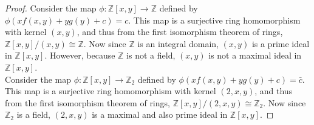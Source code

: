 \documentclass{article}
\begin{document}
  \begin{proof}
    Consider the map $\phi:\mathbb{Z}[x,y]\rightarrow\mathbb{Z}$
    defined by $\phi(xf(x,y)+yg(y)+c)=c$. This map is a surjective ring
    homomorphism with kernel $(x,y)$, and thus from the first isomorphism
    theorem of rings, $\mathbb{Z}[x,y]/(x,y)\cong\mathbb{Z}$. Now since
    $\mathbb{Z}$ is an integral domain, $(x,y)$ is a prime ideal in
    $\mathbb{Z}[x,y]$. However, because $\mathbb{Z}$ is not a field,
    $(x,y)$ is not a maximal ideal in $\mathbb{Z}[x,y]$. \\

    Consider the map $\phi:\mathbb{Z}[x,y]\rightarrow\mathbb{Z}_2$
    defined by $\phi(xf(x,y)+yg(y)+c)=\bar{c}$. This map is a surjective ring
    homomorphism with kernel $(2,x,y)$, and thus from the first isomorphism
    theorem of rings, $\mathbb{Z}[x,y]/(2,x,y)\cong\mathbb{Z}_2$. Now since
    $\mathbb{Z}_2$ is a field, $(2,x,y)$ is a maximal and also prime ideal in
    $\mathbb{Z}[x,y]$.
  \end{proof}
\end{document}
